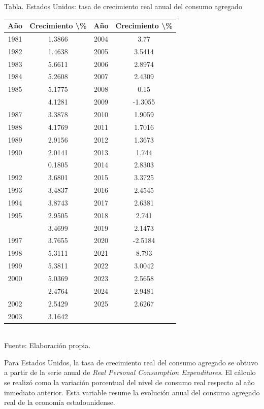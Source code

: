 \documentclass{article}\usepackage[]{graphicx}\usepackage[]{xcolor}
\begin{document}
\begin{center}
Tabla. Estados Unidos: tasa de crecimiento real anual del consumo agregado
\end{center}
\begin{center}

\begin{tabular}{cccc}
\toprule
Año & Crecimiento \textbackslash{}\% & Año & Crecimiento \textbackslash{}\%\\
\midrule
1981 & 1.3866 & 2004 & 3.77\\
1982 & 1.4638 & 2005 & 3.5414\\
1983 & 5.6611 & 2006 & 2.8974\\
1984 & 5.2608 & 2007 & 2.4309\\
1985 & 5.1775 & 2008 & 0.15\\
\addlinespace
1986 & 4.1281 & 2009 & -1.3055\\
1987 & 3.3878 & 2010 & 1.9059\\
1988 & 4.1769 & 2011 & 1.7016\\
1989 & 2.9156 & 2012 & 1.3673\\
1990 & 2.0141 & 2013 & 1.744\\
\addlinespace
1991 & 0.1805 & 2014 & 2.8303\\
1992 & 3.6801 & 2015 & 3.3725\\
1993 & 3.4837 & 2016 & 2.4545\\
1994 & 3.8743 & 2017 & 2.6381\\
1995 & 2.9505 & 2018 & 2.741\\
\addlinespace
1996 & 3.4699 & 2019 & 2.1473\\
1997 & 3.7655 & 2020 & -2.5184\\
1998 & 5.3111 & 2021 & 8.793\\
1999 & 5.3811 & 2022 & 3.0042\\
2000 & 5.0369 & 2023 & 2.5658\\
\addlinespace
2001 & 2.4764 & 2024 & 2.9481\\
2002 & 2.5429 & 2025 & 2.6267\\
2003 & 3.1642 &  & \\
\bottomrule
\end{tabular}
\\[0.3em]
{\footnotesize Fuente: Elaboración propia.}
\end{center}


Para Estados Unidos, la tasa de crecimiento real del consumo agregado se obtuvo a partir de la serie anual de \textit{Real Personal Consumption Expenditures}. El cálculo se realizó como la variación porcentual del nivel de consumo real respecto al año inmediato anterior. Esta variable resume la evolución anual del consumo agregado real de la economía estadounidense.
\end{document}
